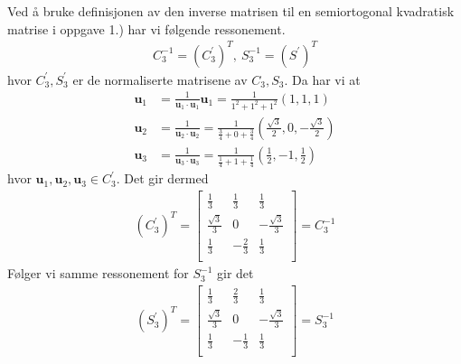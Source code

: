 \documentclass[12pt,
               a4paper,
               article,
               oneside,
               oldfontcommands,
               norsk]{memoir}
\begin{document}
Ved å bruke definisjonen av den inverse matrisen til en semiortogonal kvadratisk matrise i oppgave 1.) har vi følgende ressonement.
\begin{align*}
C_{3}^{-1} = (C_{3}^{'})^{T}, \ S_{3}^{-1} = (S^{'})^{T}
\end{align*}
hvor $C_{3}^{'}, S_{3}^{'}$ er de normaliserte matrisene av $C_3, S_3$. Da har vi at
\begin{align*}
\boldsymbol{u}_1 &= \frac{1}{\boldsymbol{u}_1 \cdot \boldsymbol{u}_1} \boldsymbol{u}_1 = \frac{1}{1^2 + 1^2 + 1^2} \left(1, 1, 1 \right) \\[5pt]
\boldsymbol{u}_2 &= \frac{1}{\boldsymbol{u}_2 \cdot \boldsymbol{u}_2} = \frac{1}{\frac{3}{4} + 0 + \frac{3}{4}} \left(\frac{\sqrt{3}}{2}, 0, -\frac{\sqrt{3}}{2} \right)\\[5pt]
\boldsymbol{u}_3 &= \frac{1}{\boldsymbol{u}_3 \cdot \boldsymbol{u}_3} = \frac{1}{\frac{1}{4} + 1 + \frac{1}{4}} \left(\frac{1}{2}, -1, \frac{1}{2} \right)
\end{align*}
hvor $\boldsymbol{u}_1, \boldsymbol{u}_2, \boldsymbol{u}_3 \in C_{3}^{'}$. Det gir dermed
\begin{align*}
(C_{3}^{'})^{T} = \begin{bmatrix}
\frac{1}{3} & \frac{1}{3} & \frac{1}{3} \\[4pt]
\frac{\sqrt{3}}{3} & 0 & -\frac{\sqrt{3}}{3}\\[4pt]
\frac{1}{3} & -\frac{2}{3} & \frac{1}{3}\\[4pt]
\end{bmatrix} = C_{3}^{-1}
\end{align*} 
Følger vi samme ressonement for $S_{3}^{-1}$ gir det
\begin{align*}
(S_{3}^{'})^T = \begin{bmatrix}
\frac{1}{3} & \frac{2}{3} & \frac{1}{3} \\[4pt]
\frac{\sqrt{3}}{3} & 0 & -\frac{\sqrt{3}}{3}\\[4pt]
\frac{1}{3} & -\frac{1}{3} & \frac{1}{3}\\[4pt]
\end{bmatrix} = S_{3}^{-1}
\end{align*}
\end{document}
